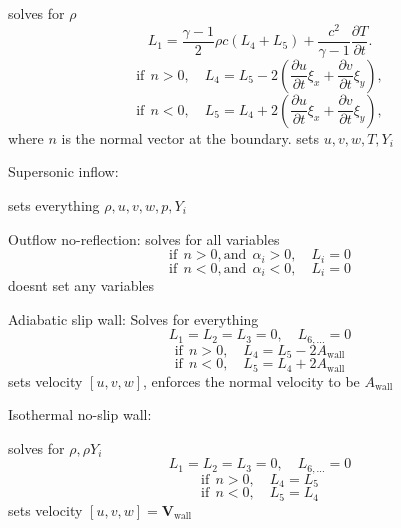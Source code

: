 solves for $\rho$ \[ \begin{equation*} L_1=\frac{\gamma -1}{2}{\rho}{c}(L_4+L_5)+\frac{c^2}{\gamma-1}\frac{\partial T}{\partial t}. \end{equation*} \] \[ \begin{equation*} \text{if}\ \ n>0, \quad L_4=L_5-2\left(\frac{\partial u}{\partial t}\xi_x+\frac{\partial v}{\partial t}\xi_y\right), \end{equation*} \] \[ \begin{equation*} \text{if}\ \ n<0, \quad L_5=L_4+2\left(\frac{\partial u}{\partial t}\xi_x+\frac{\partial v}{\partial t}\xi_y\right), \end{equation} \] where $n$ is the normal vector at the boundary. sets $u,v,w, T,Y_i$

Supersonic inflow\+:

sets everything $\rho,u,v,w,p,Y_i$

Outflow no-\/reflection\+: solves for all variables \[ \begin{equation*} \text{if}\ \ n>0, \text{and} \ \ \alpha_i>0, \quad L_i=0 \end{equation*} \] \[ \begin{equation*} \text{if}\ \ n<0, \text{and} \ \ \alpha_i<0, \quad L_i=0 \end{equation*} \] doesn\textquotesingle{}t set any variables

Adiabatic slip wall\+: Solves for everything \[ \begin{equation*} L_1=L_2=L_3=0, \quad L_{6,...}=0 \end{equation*} \] \[ \begin{equation*} \text{if}\ \ n>0, \quad L_4=L_5-2A_{\text{wall}} \end{equation*} \] \[ \begin{equation*} \text{if}\ \ n<0, \quad L_5=L_4 +2 A_{\text{wall}} \end{equation*} \] sets velocity $[u,v,w]$, enforces the normal velocity to be $A_{\text{wall}}$

Isothermal no-\/slip wall\+:

solves for $\rho, \rho Y_i$ \[ \begin{equation*} L_1=L_2=L_3=0, \quad L_{6,...}=0 \end{equation*} \] \[ \begin{equation*} \text{if}\ \ n>0, \quad L_4=L_5 \end{equation*} \] \[ \begin{equation*} \text{if}\ \ n<0, \quad L_5=L_4 \end{equation*} \] sets velocity $[u,v,w]=\mathbf{V}_{\text{wall}}$

